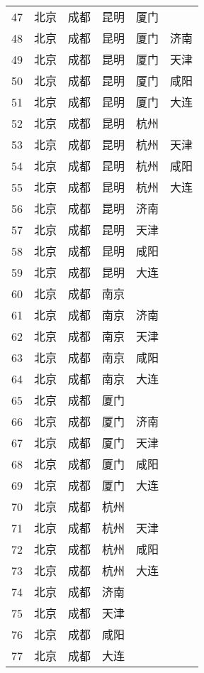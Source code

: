 \begin{footnotesize}
\begin{longtable}{cccccc}
        47	& 北京  & 成都  & 昆明  & 厦门 \\
        48	& 北京  & 成都  & 昆明  & 厦门  & 济南 \\
        49	& 北京  & 成都  & 昆明  & 厦门  & 天津 \\
        50	& 北京  & 成都  & 昆明  & 厦门  & 咸阳 \\
        51	& 北京  & 成都  & 昆明  & 厦门  & 大连 \\
        52	& 北京  & 成都  & 昆明  & 杭州 \\
        53	& 北京  & 成都  & 昆明  & 杭州  & 天津 \\
        54	& 北京  & 成都  & 昆明  & 杭州  & 咸阳 \\
        55	& 北京  & 成都  & 昆明  & 杭州  & 大连 \\
        56	& 北京  & 成都  & 昆明  & 济南 \\
        57	& 北京  & 成都  & 昆明  & 天津 \\
        58	& 北京  & 成都  & 昆明  & 咸阳 \\
        59	& 北京  & 成都  & 昆明  & 大连 \\
        60	& 北京  & 成都  & 南京 \\
        61	& 北京  & 成都  & 南京  & 济南 \\
        62	& 北京  & 成都  & 南京  & 天津 \\
        63	& 北京  & 成都  & 南京  & 咸阳 \\
        64	& 北京  & 成都  & 南京  & 大连 \\
        65	& 北京  & 成都  & 厦门 \\
        66	& 北京  & 成都  & 厦门  & 济南 \\
        67	& 北京  & 成都  & 厦门  & 天津 \\
        68	& 北京  & 成都  & 厦门  & 咸阳 \\
        69	& 北京  & 成都  & 厦门  & 大连 \\
        70	& 北京  & 成都  & 杭州 \\
        71	& 北京  & 成都  & 杭州  & 天津 \\
        72	& 北京  & 成都  & 杭州  & 咸阳 \\
        73	& 北京  & 成都  & 杭州  & 大连 \\
        74	& 北京  & 成都  & 济南 \\
        75	& 北京  & 成都  & 天津 \\
        76	& 北京  & 成都  & 咸阳 \\
        77	& 北京  & 成都  & 大连 \\

\end{longtable}
\end{footnotesize}
